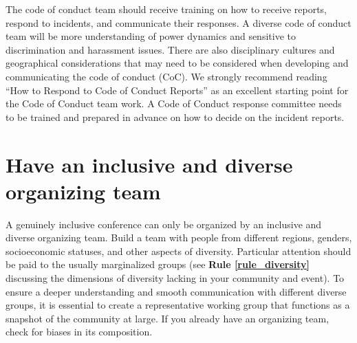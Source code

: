\documentclass[10pt,letterpaper]{article}
\begin{document}
The code of conduct team should receive training on how to receive reports, respond to incidents, and communicate their responses. A diverse code of conduct team will be more understanding of power dynamics and sensitive to discrimination and harassment issues. There are also disciplinary cultures and geographical considerations that may need to be considered when developing and communicating the code of conduct (CoC). We strongly recommend reading “How to Respond to Code of Conduct Reports” \cite{aurora2019} as an excellent starting point for the Code of Conduct team work. A Code of Conduct response committee needs to be trained and prepared in advance on how to decide on the incident reports. 



\section{Have an inclusive and diverse organizing team}
\label{rule_organizing_team}

A genuinely inclusive conference can only be organized by an inclusive and diverse organizing team. Build a team with people from different regions, genders, socioeconomic statuses, and other aspects of diversity. Particular attention should be paid to the usually marginalized groups (see \textbf{Rule \ref{rule_diversity}} discussing the dimensions of diversity lacking in your community and event). To ensure a deeper understanding and smooth communication with different diverse groups, it is essential to create a representative working group that functions as a snapshot of the community at large. If you already have an organizing team, check for biases in its composition. 

\end{document}
